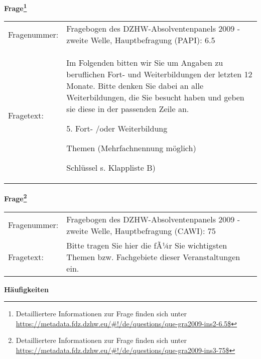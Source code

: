 				\vspace*{0.5cm}
                \noindent\textbf{Frage\footnote{Detailliertere Informationen zur Frage finden sich unter
		              \url{https://metadata.fdz.dzhw.eu/\#!/de/questions/que-gra2009-ins2-6.5$}}}\\
				\begin{tabularx}{\hsize}{@{}lX}
					Fragenummer: &
					  Fragebogen des DZHW-Absolventenpanels 2009 - zweite Welle, Hauptbefragung (PAPI):
					  6.5
 \\
					Fragetext: & Im Folgenden bitten wir Sie um Angaben zu beruflichen Fort- und Weiterbildungen der letzten 12 Monate. Bitte denken Sie dabei an alle Weiterbildungen, die Sie besucht haben und geben sie diese in der passenden Zeile an.\par  5. Fort- /oder Weiterbildung\par  Themen (Mehrfachnennung möglich)\par  Schlüssel s. Klappliste B) \\
				\end{tabularx}
				\vspace*{0.5cm}
                \noindent\textbf{Frage\footnote{Detailliertere Informationen zur Frage finden sich unter
		              \url{https://metadata.fdz.dzhw.eu/\#!/de/questions/que-gra2009-ins3-75$}}}\\
				\begin{tabularx}{\hsize}{@{}lX}
					Fragenummer: &
					  Fragebogen des DZHW-Absolventenpanels 2009 - zweite Welle, Hauptbefragung (CAWI):
					  75
 \\
					Fragetext: & Bitte tragen Sie hier die fÃ¼r Sie wichtigsten Themen bzw. Fachgebiete dieser Veranstaltungen ein. \\
				\end{tabularx}





        		\vspace*{0.5cm}
                \noindent\textbf{Häufigkeiten}

